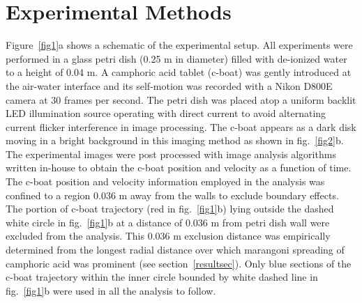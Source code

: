 \documentclass[journal=langd5, manuscript=article, layout=twocolumn]{achemso}
\begin{document}
\section{Experimental Methods}
\label{expsec}
Figure~\ref{fig1}a shows a schematic of the experimental setup. All experiments were performed in a glass petri dish (0.25 m in diameter) filled with de-ionized water to a height of 0.04 m. A camphoric acid tablet (c-boat) was gently introduced at the air-water interface and its self-motion was recorded with a Nikon D800E camera at 30 frames per second. The petri dish was placed atop a uniform backlit LED illumination source operating with direct current to avoid alternating current flicker interference in image processing.  The c-boat appears as a dark disk moving in a bright background in this imaging method as shown in fig.~\ref{fig2}b. The experimental images were post processed with image analysis algorithms written in-house to obtain the c-boat position and velocity as a function of time. The c-boat position and velocity information employed in the analysis was confined to a region 0.036 m away from the walls to exclude boundary effects. The portion of c-boat trajectory (red in fig.~\ref{fig1}b) lying outside the dashed white circle in fig.~\ref{fig1}b at a distance of 0.036 m from petri dish wall were excluded from the analysis. This 0.036 m exclusion distance was empirically determined from the longest radial distance over which marangoni spreading of camphoric acid was prominent (see section~\ref{resultsec}). Only blue sections of the c-boat trajectory within the inner circle bounded by white dashed line in fig.~\ref{fig1}b were used in all the analysis to follow.
\end{document}
